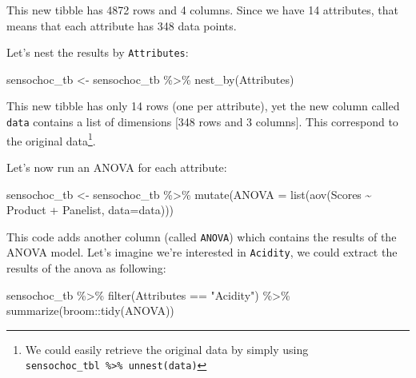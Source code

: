 \documentclass[
]{krantz}
\makeatletter
\newenvironment{Shaded}{\begin{snugshade}}{\end{snugshade}}
\newcommand{\AttributeTok}[1]{\textcolor[rgb]{0.61,0.61,0.61}{#1}}
\newcommand{\FunctionTok}[1]{\textcolor[rgb]{0,0,0}{#1}}
\newcommand{\NormalTok}[1]{#1}
\newcommand{\OtherTok}[1]{\textcolor[rgb]{0.37,0.37,0.37}{#1}}
\newcommand{\SpecialCharTok}[1]{\textcolor[rgb]{0,0,0}{#1}}
\newcommand{\StringTok}[1]{\textcolor[rgb]{0.5,0.5,0.5}{#1}}
\newenvironment{kframe}{%
\medskip{}
\setlength{\fboxsep}{.8em}
 \def\at@end@of@kframe{}%
 \ifinner\ifhmode%
  \def\at@end@of@kframe{\end{minipage}}%
  \begin{minipage}{\columnwidth}%
 \fi\fi%
 \def\FrameCommand##1{\hskip\@totalleftmargin \hskip-\fboxsep
 \colorbox{shadecolor}{##1}\hskip-\fboxsep
     \hskip-\linewidth \hskip-\@totalleftmargin \hskip\columnwidth}%
 \MakeFramed {\advance\hsize-\width
   \@totalleftmargin\z@ \linewidth\hsize
   \@setminipage}}%
 {\par\unskip\endMakeFramed%
 \at@end@of@kframe}
\renewenvironment{Shaded}{\begin{kframe}}{\end{kframe}}
\makeatother
\begin{document}
This new tibble has 4872 rows and 4 columns. Since we have 14 attributes, that means that each attribute has 348 data points.

Let's nest the results by \texttt{Attributes}:

\begin{Shaded}
\begin{Highlighting}[]
\NormalTok{sensochoc\_tb }\OtherTok{\textless{}{-}}\NormalTok{ sensochoc\_tb }\SpecialCharTok{\%\textgreater{}\%}
  \FunctionTok{nest\_by}\NormalTok{(Attributes)}
\end{Highlighting}
\end{Shaded}

This new tibble has only 14 rows (one per attribute), yet the new column called \texttt{data} contains a list of dimensions {[}348 rows and 3 columns{]}. This correspond to the original data\footnote{We could easily retrieve the original data by simply using \texttt{sensochoc\_tbl\ \%\textgreater{}\%\ unnest(data)}}.

Let's now run an ANOVA for each attribute:

\begin{Shaded}
\begin{Highlighting}[]
\NormalTok{sensochoc\_tb }\OtherTok{\textless{}{-}}\NormalTok{ sensochoc\_tb }\SpecialCharTok{\%\textgreater{}\%} 
  \FunctionTok{mutate}\NormalTok{(}\AttributeTok{ANOVA =} \FunctionTok{list}\NormalTok{(}\FunctionTok{aov}\NormalTok{(Scores }\SpecialCharTok{\textasciitilde{}}\NormalTok{ Product }\SpecialCharTok{+}\NormalTok{ Panelist, }\AttributeTok{data=}\NormalTok{data)))}
\end{Highlighting}
\end{Shaded}

This code adds another column (called \texttt{ANOVA}) which contains the results of the ANOVA model.
Let's imagine we're interested in \texttt{Acidity}, we could extract the results of the anova as following:

\begin{Shaded}
\begin{Highlighting}[]
\NormalTok{sensochoc\_tb }\SpecialCharTok{\%\textgreater{}\%} 
  \FunctionTok{filter}\NormalTok{(Attributes }\SpecialCharTok{==} \StringTok{"Acidity"}\NormalTok{) }\SpecialCharTok{\%\textgreater{}\%} 
  \FunctionTok{summarize}\NormalTok{(broom}\SpecialCharTok{::}\FunctionTok{tidy}\NormalTok{(ANOVA))}
\end{Highlighting}
\end{Shaded}
\end{document}
